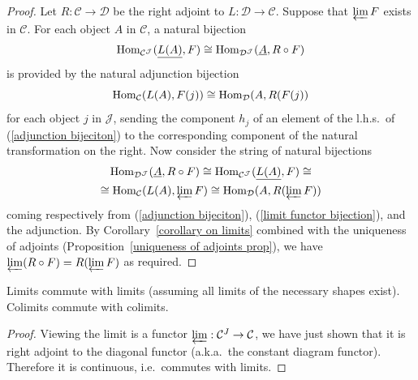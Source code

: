 \begin{proof}
    Let $R:\mathcal{C}\to \mathcal{D}$ be the right adjoint to $L:\mathcal{D}\to\mathcal{C}$. Suppose that $\varprojlim F$ exists in $\mathcal{C}$. For each object $A$ in $\mathcal{C}$, a natural bijection
    \[\operatorname{Hom}_{\mathcal{C}^\mathcal{J}}(\underline{L(A)},F)\cong \operatorname{Hom}_{\mathcal{D}^\mathcal{J}}(\underline{A},R\circ F) \label{adjunction bijeciton}\]
    is provided by the natural adjunction bijection
    \[\operatorname{Hom}_{\mathcal{C}}(L(A),F(j))\cong \operatorname{Hom}_{\mathcal{D}}(A,R(F(j))\]
    for each object $j$ in $\mathcal{J}$, sending the component $h_j$ of an element of the l.h.s.~of (\ref{adjunction bijeciton}) to the corresponding component of the natural transformation on the right. Now consider the string of natural bijections
    \begin{multline}
        \operatorname{Hom}_{\mathcal{D}^\mathcal{J}}(\underline{A},R\circ F)\cong \operatorname{Hom}_{\mathcal{C}^\mathcal{J}}(\underline{L(A)},F)\cong \\ 
        \cong \operatorname{Hom}_{\mathcal{C}}(L(A),\varprojlim F)\cong \operatorname{Hom}_{\mathcal{D}}(A,R(\varprojlim F))
    \end{multline}
    coming respectively from (\ref{adjunction bijeciton}), (\ref{limit functor bijection}), and the adjunction. By Corollary~\ref{corollary on limits} combined with the uniqueness of adjoints (Proposition~\ref{uniqueness of adjoints prop}), we have $\varprojlim(R\circ F)= R(\varprojlim F)$ as required.
\end{proof}
\begin{cor}
    Limits commute with limits (assuming all limits of the necessary shapes exist). Colimits commute with colimits.
\end{cor}
\begin{proof}
    Viewing the limit is a functor  $\varprojlim:\mathcal{C}^J\to \mathcal{C}$, we have just shown that it is right adjoint to the diagonal functor (a.k.a.~the constant diagram functor). Therefore it is continuous, i.e.~commutes with limits. 
\end{proof}

